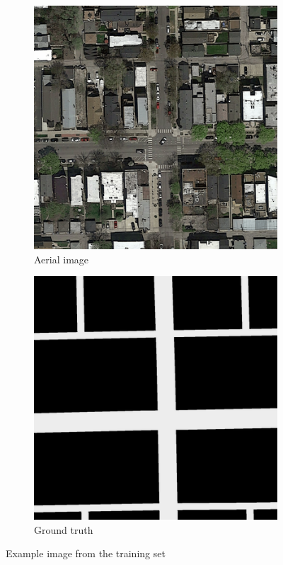 \documentclass[10pt,conference,a4paper]{IEEEtran}
\begin{document}
\begin{figure}[ht]
  \begin{subfigure}[b]{0.2\textwidth}
    \includegraphics[width=\textwidth]{project2/report/images/image.png}
    \caption{Aerial image}
    \label{fig:aerial}
  \end{subfigure}
  \begin{subfigure}[b]{0.2\textwidth}
    \includegraphics[width=\textwidth]{project2/report/images/groundtruth.png}
    \caption{Ground truth}
    \label{fig:gt}
  \end{subfigure}
  \centering
  \caption{Example image from the training set}
\end{figure}
\end{document}
